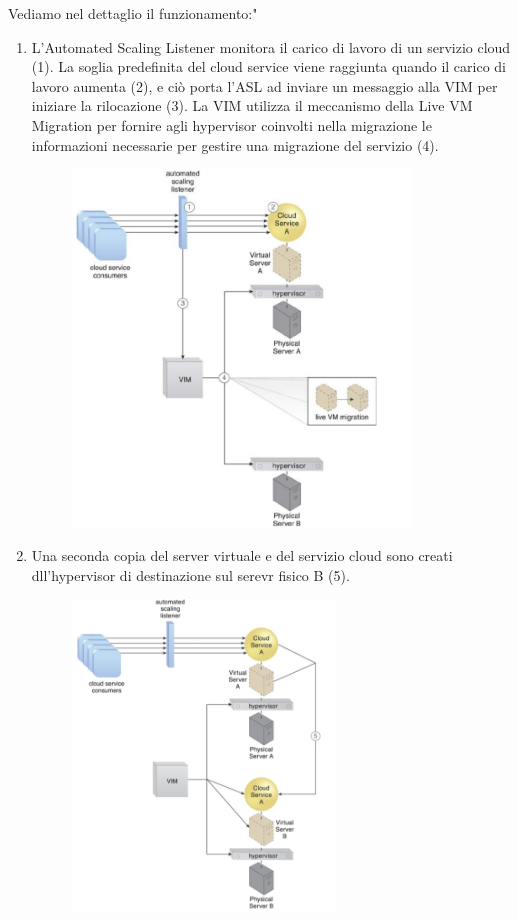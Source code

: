 Vediamo nel dettaglio il funzionamento:"
\begin{enumerate}
    \item L'Automated Scaling Listener monitora il carico di lavoro di un servizio cloud (1). La soglia predefinita del cloud service viene raggiunta quando il carico di lavoro aumenta (2), e ciò porta l'ASL ad inviare un messaggio alla VIM per iniziare la rilocazione (3). La VIM utilizza il meccanismo della Live VM Migration per fornire agli hypervisor coinvolti nella migrazione le informazioni necessarie per gestire una migrazione del servizio (4).
    
    \begin{figure}[htb!]
    \centering
    \includegraphics[width=9cm]{./Images/cap12/12.6.png}
    \end{figure}
    
    \item Una seconda copia del server virtuale e del servizio cloud sono creati dll'hypervisor di destinazione sul serevr fisico B (5).
    
    \begin{figure}[htb!]
    \centering
    \includegraphics[width=7cm]{./Images/cap12/12.7.png}
    \end{figure}
    

\end{enumerate}
